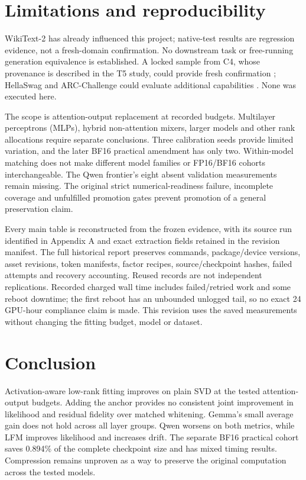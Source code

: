 \documentclass[conference]{IEEEtran}
\begin{document}
\section{Limitations and reproducibility}
WikiText-2 has already influenced this project; native-test results are regression evidence, not a fresh-domain confirmation. No downstream task or free-running generation equivalence is established. A locked sample from C4, whose provenance is described in the T5 study, could provide fresh confirmation \cite{raffel2020t5}; HellaSwag and ARC-Challenge could evaluate additional capabilities \cite{zellers2019hellaswag} \cite{clark2018arc}. None was executed here.\par\smallskip
The scope is attention-output replacement at recorded budgets. Multilayer perceptrons (MLPs), hybrid non-attention mixers, larger models and other rank allocations require separate conclusions. Three calibration seeds provide limited variation, and the later BF16 practical amendment has only two. Within-model matching does not make different model families or FP16/BF16 cohorts interchangeable. The Qwen frontier's eight absent validation measurements remain missing. The original strict numerical-readiness failure, incomplete coverage and unfulfilled promotion gates prevent promotion of a general preservation claim.\par\smallskip
Every main table is reconstructed from the frozen evidence, with its source run identified in Appendix A and exact extraction fields retained in the revision manifest. The full historical report preserves commands, package/device versions, asset revisions, token manifests, factor recipes, source/checkpoint hashes, failed attempts and recovery accounting. Reused records are not independent replications. Recorded charged wall time includes failed/retried work and some reboot downtime; the first reboot has an unbounded unlogged tail, so no exact 24 GPU-hour compliance claim is made. This revision uses the saved measurements without changing the fitting budget, model or dataset.\par\smallskip
\section{Conclusion}
Activation-aware low-rank fitting improves on plain SVD at the tested attention-output budgets. Adding the anchor provides no consistent joint improvement in likelihood and residual fidelity over matched whitening. Gemma's small average gain does not hold across all layer groups. Qwen worsens on both metrics, while LFM improves likelihood and increases drift. The separate BF16 practical cohort saves 0.894\% of the complete checkpoint size and has mixed timing results. Compression remains unproven as a way to preserve the original computation across the tested models.\par\smallskip
\end{document}
